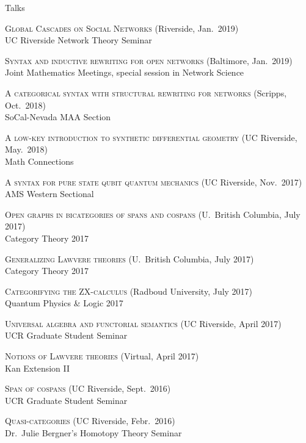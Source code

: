\documentclass{Resume} %
\begin{document}

\begin{rSection}{Talks}

   \textsc{Global Cascades on Social Networks} \hfill
  (Riverside, Jan.~2019) \\
  UC Riverside Network Theory Seminar
  
    \textsc{Syntax and inductive rewriting for open networks} \hfill
  (Baltimore, Jan.~2019) \\
  Joint Mathematics Meetings, special session in Network Science

  \textsc{A categorical syntax with structural rewriting for networks} \hfill
  (Scripps, Oct.~2018) \\
  SoCal-Nevada MAA Section

  
  \textsc{A low-key introduction to synthetic differential geometry} \hfill
  (UC Riverside, May.~2018) \\
  Math Connections
  
  \textsc{A  syntax for pure state qubit quantum mechanics} \hfill (UC Riverside, Nov.~2017) \\
  AMS Western Sectional

  \textsc{Open graphs in bicategories of spans and cospans} \hfill
  (U.~British Columbia, July 2017) \\
  Category Theory 2017
	
  \textsc{Generalizing Lawvere theories} \hfill
  (U.~British Columbia, July 2017) \\
  Category Theory 2017
	
  \textsc{Categorifying the ZX-calculus} \hfill
  (Radboud University, July 2017) \\
  Quantum Physics \& Logic 2017

  \textsc{Universal algebra and functorial semantics} \hfill
  (UC Riverside, April 2017) \\
  UCR Graduate Student Seminar
	
  \textsc{Notions of Lawvere theories} \hfill
  (Virtual, April 2017) \\
  Kan Extension II
	
  \textsc{Span of cospans} \hfill
  (UC Riverside, Sept.~2016) \\
  UCR Graduate Student Seminar

  \textsc{Quasi-categories} \hfill
  (UC Riverside, Febr.~2016) \\
  Dr.\ Julie Bergner's Homotopy Theory Seminar
\end{rSection}
\end{document}
